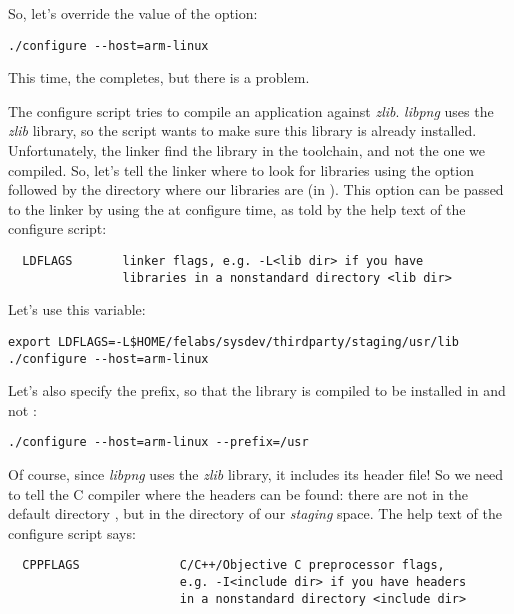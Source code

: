 So, let's override the value of the  option:

\begin{verbatim}
./configure --host=arm-linux
\end{verbatim}


This time, the  completes, but there is a problem.

The configure script tries to compile an application against {\em zlib}. 
{\em libpng} uses the {\em zlib} library, so the  script wants to make
sure this library is already installed. Unfortunately, the 
linker find the library in the toolchain, and not the one we compiled. 
So, let's tell the linker where to
look for libraries using the  option followed by the
directory where our libraries are (in ). This
 option can be passed to the linker by using the
 at configure time, as told by the help text of the
configure script:

\begin{verbatim}
  LDFLAGS       linker flags, e.g. -L<lib dir> if you have
                libraries in a nonstandard directory <lib dir>
\end{verbatim}

Let's use this  variable:

\begin{verbatim}
export LDFLAGS=-L$HOME/felabs/sysdev/thirdparty/staging/usr/lib
./configure --host=arm-linux
\end{verbatim}

Let's also specify the prefix, so that the library is compiled to be
installed in  and not :

\begin{verbatim}
./configure --host=arm-linux --prefix=/usr
\end{verbatim}

Of course, since {\em libpng} uses the {\em zlib} library, it includes
its header file! So we need to tell the C compiler where the headers
can be found: there are not in the default directory
, but in the  directory of our
{\em staging} space. The help text of the configure script says:

\begin{verbatim}
  CPPFLAGS              C/C++/Objective C preprocessor flags,
                        e.g. -I<include dir> if you have headers
                        in a nonstandard directory <include dir>
\end{verbatim}

